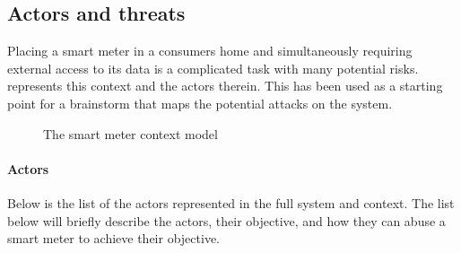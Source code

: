\subsection{Actors and threats}
Placing a smart meter in a consumers home and simultaneously requiring external access to its data is a complicated task with many potential risks.
 represents this context and the actors therein.
This has been used as a starting point for a brainstorm that maps the potential attacks on the system.

\begin{figure}[h]
  \centering
  
  \caption{The smart meter context model}
  \label{contextual:sm_model}
\end{figure}

\paragraph{Actors}\label{contextActors}
Below is the list of the actors represented in the full system and context.
The list below will briefly describe the actors, their objective, and how they can abuse a smart meter to achieve their objective.

